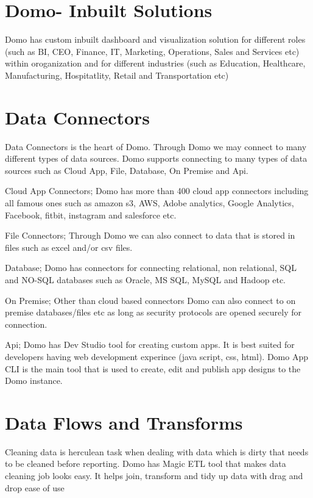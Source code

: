 \section{Domo- Inbuilt Solutions}

Domo has custom inbuilt dashboard and visualization solution 
for different roles (such as BI, CEO, Finance, IT, Marketing,
 Operations, Sales and Services etc)  within oroganization and 
for different industries (such as Education, Healthcare,
 Manufacturing, Hospitatlity, Retail and Transportation etc)


\section{Data Connectors}
Data Connectors is the heart of Domo. Through Domo we may 
connect to many different types of data sources. Domo supports 
connecting to many types of data sources such as  Cloud App,
 File, Database, On Premise and Api.

Cloud App Connectors; Domo has  more than 400 cloud app 
connectors including all famous ones such as amazon s3,
 AWS, Adobe analytics, Google Analytics, Facebook, fitbit,
 instagram and salesforce etc. 

File Connectors; Through Domo we can also connect to data 
that is stored in files such as excel and/or csv files.

Database; Domo has connectors for connecting relational,
 non relational, SQL and NO-SQL databases such as Oracle,
 MS SQL, MySQL and Hadoop etc.

On Premise; Other than cloud based connectors Domo can also 
connect to on premise databases/files etc as long as security 
protocols are opened securely for connection.

Api; Domo has Dev Studio tool for creating custom apps. 
It is best suited for developers having web development 
experince (java script, css, html). Domo App CLI is the 
main tool that is used to create, edit and publish app designs 
to the Domo instance.


\section{Data Flows and Transforms}

Cleaning data is herculean task when dealing with data which 
is dirty that needs to be cleaned before reporting. Domo has 
Magic ETL tool that makes data cleaning job looks easy. 
It helps join, transform and tidy up data with drag and 
drop ease of use~\cite{hid-sp18-523-Dev} 


